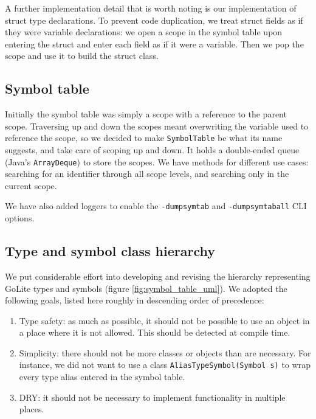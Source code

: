 \documentclass[oneside]{article}
\begin{document}
A further implementation detail that is worth noting is our implementation of struct type declarations. To prevent code duplication, we treat struct fields as if they were variable declarations: we open a scope in the symbol table upon entering the struct and enter each field as if it were a variable. Then we pop the scope and use it to build the struct class.

\subsection{Symbol table}

Initially the symbol table was simply a scope with a reference to the parent scope. Traversing up and down the scopes meant overwriting the variable used to reference the scope, so we decided to make \texttt{SymbolTable} be what its name suggests, and take care of scoping up and down. It holds a double-ended queue (Java's \texttt{ArrayDeque}) to store the scopes. We have methods for different use cases: searching for an identifier through all scope levels, and searching only in the current scope.

We have also added loggers to enable the \verb|-dumpsymtab| and \verb|-dumpsymtaball| CLI options.

\subsection{Type and symbol class hierarchy}

We put considerable effort into developing and revising the hierarchy representing GoLite types and symbols (figure \ref{fig:symbol_table_uml}). We adopted the following goals, listed here roughly in descending order of precedence:

\begin{enumerate}
    \item Type safety: as much as possible, it should not be possible to use an object in a place where it is not allowed. This should be detected at compile time.
    \item Simplicity: there should not be more classes or objects than are necessary. For instance, we did not want to use a class \texttt{AliasTypeSymbol(Symbol s)} to wrap every type alias entered in the symbol table.
    \item DRY: it should not be necessary to implement functionality in multiple places.
\end{enumerate}
\end{document}
